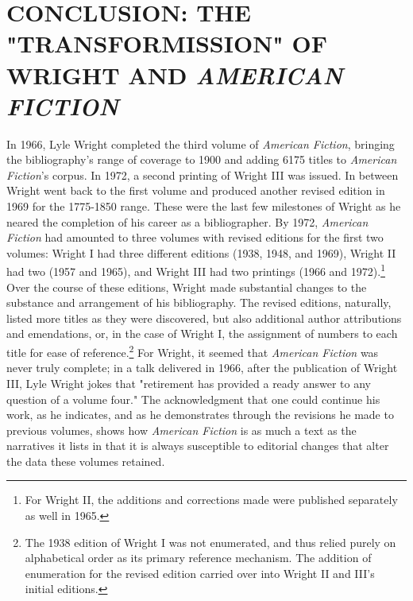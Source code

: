 %
%
%
%

\chapter{CONCLUSION: THE "TRANSFORMISSION" OF WRIGHT AND \textit{AMERICAN FICTION}}

In 1966, Lyle Wright completed the third volume of \textit{American Fiction}, bringing the bibliography's range of coverage to 1900 and adding 6175 titles to \textit{American Fiction}'s corpus. In 1972, a second printing of Wright III was issued. In between Wright went back to the first volume and produced another revised edition in 1969 for the 1775-1850 range. These were the last few milestones of Wright as he neared the completion of his career as a bibliographer. By 1972, \textit{American Fiction} had amounted to three volumes with revised editions for the first two volumes: Wright I had three different editions (1938, 1948, and 1969), Wright II had two (1957 and 1965), and Wright III had two printings (1966 and 1972).\footnote{For Wright II, the additions and corrections made were published separately as well in 1965.} Over the course of these editions, Wright made substantial changes to the substance and arrangement of his bibliography. The revised editions, naturally, listed more titles as they were discovered, but also additional author attributions and emendations, or, in the case of Wright I, the assignment of numbers to each title for ease of reference.\footnote{The 1938 edition of Wright I was not enumerated, and thus relied purely on alphabetical order as its primary reference mechanism. The addition of enumeration for the revised edition carried over into Wright II and III's initial editions.} For Wright, it seemed that \textit{American Fiction} was never truly complete; in a talk delivered in 1966, after the publication of Wright III, Lyle Wright jokes that "retirement has provided a ready answer to any question of a volume four."\autocite[31]{wright_pursuit_1966} The acknowledgment that one could continue his work, as he indicates, and as he demonstrates through the revisions he made to previous volumes, shows how \textit{American Fiction} is as much a text as the narratives it lists in that it is always susceptible to editorial changes that alter the data these volumes retained.

